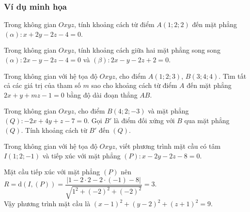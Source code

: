 \subsubsection{Ví dụ minh họa}
\setcounter{subsubsection}{0}
\setcounter{vd}{0}
\setcounter{bt}{0}
\setcounter{ex}{0}
\begin{vd} %
	Trong không gian $Oxyz$, tính  khoảng cách từ điểm $A(1;2;2)$ đến mặt phẳng $(\alpha)\colon x+2y-2z-4=0$.

\end{vd}
\begin{vd} %
	Trong không gian $Oxyz$, tính khoảng cách giữa hai mặt phẳng song song $(\alpha)\colon 2x-y-2z-4=0$ và $(\beta)\colon 2x-y-2z+2=0$.
\end{vd}
\begin{vd}%
	Trong không gian với hệ tọa độ $Oxyz$, cho  điểm $A(1;2;3)$, $B(3;4;4)$. Tìm tất cả các giá trị của tham số $m$ sao cho khoảng cách từ điểm $A$ đến mặt phẳng $2x+y+mz-1=0$ bằng độ dài đoạn thẳng $AB$.
	
\end{vd}
\begin{vd}%
	Trong không gian $Oxyz$, cho điểm $B(4;2;-3)$ và mặt phẳng $(Q):-2x+4y+z-7=0$. Gọi $B'$ là điểm đối xứng với $B$ qua mặt phẳng $(Q)$. Tính khoảng cách từ $B'$ đến $(Q)$.
\end{vd}
\begin{vd}%
	Trong không gian với hệ tọa độ $Oxyz$, viết phương trình mặt cầu có tâm $I(1; 2; -1)$ và tiếp xúc với mặt phẳng $(P)\colon x-2y-2z-8=0$.

	\loigiai
	{Mặt cầu tiếp xúc với mặt phẳng $(P)$ nên  $R=\mathrm{d}\left(I, (P)\right)=\dfrac{|1-2\cdot 2-2\cdot (-1)-8|}{\sqrt{1^2+(-2)^2+(-2)^2}}=3$.\\
		Vậy	phương trình mặt cầu là $(x - 1)^2 + (y - 2)^2 + (z + 1)^2= 9$.
	}
\end{vd}
